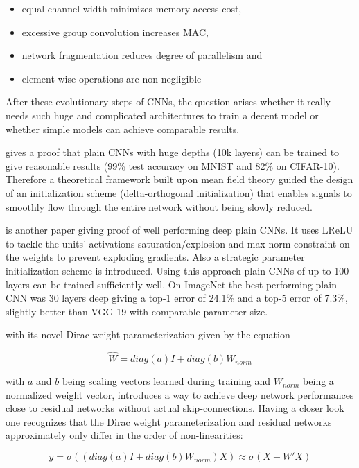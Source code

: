 \begin{itemize}
	\item equal channel width minimizes memory access cost, 
	\item excessive group convolution increases MAC, 
	\item network fragmentation reduces degree of parallelism and
	\item element-wise operations are non-negligible
\end{itemize}

After these evolutionary steps of CNNs, the question arises whether it really needs such huge and complicated architectures to train a decent model or whether simple models can achieve comparable results. 

\cite{LechaoXiao.2018} gives a proof that plain CNNs with huge depths (10k layers) can be trained to give reasonable results (99\% test accuracy on MNIST and 82\% on CIFAR-10). Therefore a theoretical framework built upon mean field theory guided the design of an initialization scheme (delta-orthogonal initialization) that enables signals to smoothly flow through the entire network without being slowly reduced. 

\cite{OyebadeOyedotun.2020} is another paper giving proof of well performing deep plain CNNs. It uses LReLU to tackle the units' activations saturation/explosion and max-norm constraint on the weights to prevent exploding gradients. Also a strategic parameter initialization scheme is introduced. Using this approach plain CNNs of up to 100 layers can be trained sufficiently well. On ImageNet the best performing plain CNN was 30 layers deep giving a top-1 error of 24.1\% and a top-5 error of 7.3\%, slightly better than VGG-19 with comparable parameter size. 

\cite{SergeyZagoruyko.2018} with its novel Dirac weight parameterization given by the equation 

\begin{equation}
	\hat{W} = diag(a)I + diag(b)W_{norm}
\end{equation}

with $a$ and $b$ being scaling vectors learned during training and $W_{norm}$ being a normalized weight vector, introduces a way to achieve deep network performances close to residual networks without actual skip-connections. Having a closer look one recognizes that the Dirac weight parameterization and residual networks approximately only differ in the order of non-linearities:

\begin{equation}
	y = \sigma((diag(a)I + diag(b)W_{norm}) X) \approx \sigma(X + W'X)
\end{equation}

